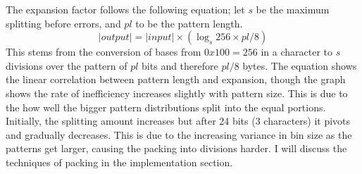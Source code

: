 \documentclass[ %
                    author={Samuel Russell},
                supervisor={Prof. Bogdan Warinschi},
                    degree={MEng},
                     title={Innocuous Ciphertexts},
                  subtitle={The DE-CENSOR Scheme},
                      type={Research},
                      year={2018} ]{dissertation}
\begin{document}
%
%

The expansion factor follows the following equation; let $s$ be the maximum splitting before errors, and $pl$ to be the pattern length.
$$|output| = |input| \times \left( \log_s 256 \times pl / 8 \right)$$
This stems from the conversion of bases from $0x100=256$ in a character to $s$ divisions over the pattern of $pl$ bits and therefore $pl/8$ bytes. The equation shows the linear correlation between pattern length and expansion, though the graph shows the rate of inefficiency increases slightly with pattern size. This is due to the how well the bigger pattern distributions split into the equal portions. Initially, the splitting amount increases but after 24 bits (3 characters) it pivots and gradually decreases.  This is due to the increasing variance in bin size as the patterns get larger, causing the packing into divisions harder. I will discuss the techniques of packing in the implementation section.
\end{document}
